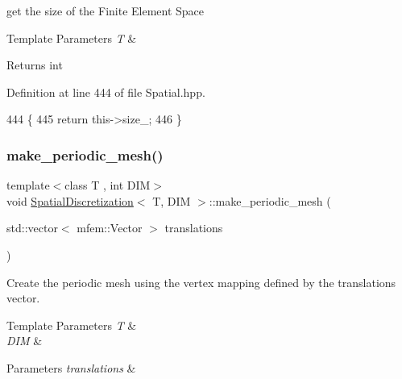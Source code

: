 get the size of the Finite Element Space 


\begin{DoxyTemplParams}{Template Parameters}
{\em T} & \\
\hline
\end{DoxyTemplParams}
\begin{DoxyReturn}{Returns}
int 
\end{DoxyReturn}


Definition at line 444 of file Spatial.\+hpp.


\begin{DoxyCode}
444                                                  \{
445   \textcolor{keywordflow}{return} this->size\_;
446 \}
\end{DoxyCode}
\mbox{\label{classSpatialDiscretization_a4b88c0c7dbdb10a8d1442e599ac9a831}} 
\subsubsection{\texorpdfstring{make\+\_\+periodic\+\_\+mesh()}{make\_periodic\_mesh()}}
{\footnotesize\ttfamily template$<$class T , int D\+IM$>$ \\
void \hyperlink{classSpatialDiscretization}{Spatial\+Discretization}$<$ T, D\+IM $>$\+::make\+\_\+periodic\+\_\+mesh (\begin{DoxyParamCaption}\item[{std\+::vector$<$ mfem\+::\+Vector $>$}]{translations }\end{DoxyParamCaption})}



Create the periodic mesh using the vertex mapping defined by the translations vector. 


\begin{DoxyTemplParams}{Template Parameters}
{\em T} & \\
\hline
{\em D\+IM} & \\
\hline
\end{DoxyTemplParams}

\begin{DoxyParams}{Parameters}
{\em translations} & \\
\hline
\end{DoxyParams}


